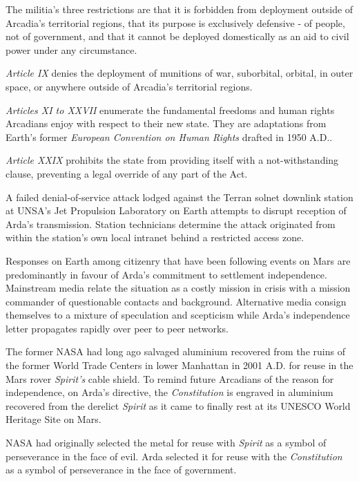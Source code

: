 The militia's three restrictions are that it is forbidden from deployment outside of Arcadia's territorial regions, that its purpose is exclusively defensive - of people, not of government, and that it cannot be deployed domestically as an aid to civil power under any circumstance.

\item {\it Article IX} denies the deployment of munitions of war, suborbital, orbital, in outer space, or anywhere outside of Arcadia's territorial regions.

\item {\it Articles XI to XXVII} enumerate the fundamental freedoms and human rights Arcadians enjoy with respect to their new state. They are adaptations from Earth's former {\it European Convention on Human Rights} drafted in 1950 A.D..

\item {\it Article XXIX} prohibits the state from providing itself with a not-withstanding clause, preventing a legal override of any part of the Act.
\stopitemize
\stopTimelineDocument

A failed denial-of-service attack lodged against the Terran solnet downlink station at UNSA's Jet Propulsion Laboratory on Earth attempts to disrupt reception of Arda's transmission. Station technicians determine the attack originated from within the station's own local intranet behind a restricted access zone.

Responses on Earth among citizenry that have been following events on Mars are predominantly in favour of Arda's commitment to settlement independence. Mainstream media relate the situation as a costly mission in crisis with a mission commander of questionable contacts and background. Alternative media consign themselves to a mixture of speculation and scepticism while Arda's independence letter propagates rapidly over peer to peer networks.
\StopTimelineDate

The former NASA had long ago salvaged aluminium recovered from the ruins of the former World Trade Centers in lower Manhattan in 2001 A.D. for reuse in the Mars rover {\it Spirit's} cable shield. To remind future Arcadians of the reason for independence, on Arda's directive, the {\it Constitution} is engraved in aluminium recovered from the derelict {\it Spirit} as it came to finally rest at its UNESCO World Heritage Site on Mars. 

NASA had originally selected the metal for reuse with {\it Spirit} as a symbol of perseverance in the face of evil. Arda selected it for reuse with the {\it Constitution} as a symbol of perseverance in the face of government.
\StopTimelineDate

